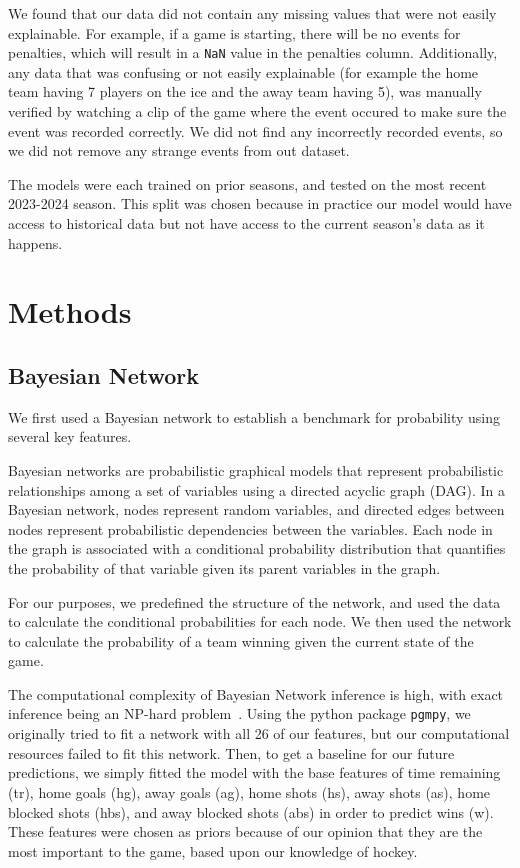 \documentclass[11pt]{article}
\begin{document}
We found that our data did not contain any missing values that were not easily explainable. For example, if a game is starting, there will be no
events for penalties, which will result in a {\tt NaN} value in the penalties column. Additionally, any data that was confusing or not easily explainable
(for example the home team having 7 players on the ice and the away team having 5), was manually verified by watching a clip of the game where
the event occured to make sure the event was recorded correctly. We did not find any incorrectly recorded events, so we 
did not remove any strange events from out dataset.

The models were each trained on prior seasons, and tested on the most recent 2023-2024 season. This split was chosen because in practice our model would have access to historical data but not have access to the current season's data as it happens.

\section{Methods}

\subsection{Bayesian Network}
We first used a Bayesian network to establish a benchmark for probability using several key features.

Bayesian networks are probabilistic graphical models that represent probabilistic relationships among a set of variables using a directed acyclic graph (DAG). 
In a Bayesian network, nodes represent random variables, and directed edges between nodes represent probabilistic dependencies between the variables. Each node in the graph is associated with a conditional probability distribution that quantifies the probability of that variable given its parent variables in the graph.

For our purposes, we predefined the structure of the network, and used the data to calculate the conditional probabilities for each node. We then used the network to calculate the probability of a team winning given the current state of the game.

The computational complexity of Bayesian Network inference is high, with exact inference being an NP-hard problem~\cite{pmlr-vR0-chickering95a}. 
Using the python package {\tt pgmpy}, we originally tried to fit a network with all 26 of our features, but our computational resources failed to fit this network.
Then, to get a baseline for our future predictions, we simply fitted the model with the base features of time remaining (tr), home goals (hg), away goals (ag), home shots (hs), away shots (as), home blocked shots (hbs), and away blocked shots (abs) in order to predict wins (w). 
These features were chosen as priors because of our opinion that they are the most important to the game, based upon our knowledge of hockey.
\end{document}
